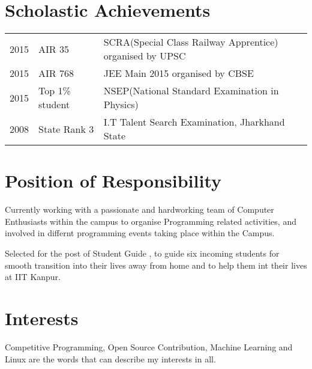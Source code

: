 \documentclass{deedy-resume-openfont}
\begin{document}
\begin{minipage}[t]{0.66\textwidth}
\section{Scholastic Achievements} 
\begin{tabular}{rll}
2015	     & AIR 35  & SCRA(Special Class Railway Apprentice) organised by UPSC\\
2015	     & AIR 768  & JEE Main 2015 organised by CBSE \\
2015	     & Top 1\% student  & NSEP(National Standard Examination in Physics)\\
2008	     & State Rank 3 & I.T Talent Search Examination, Jharkhand State\\
\end{tabular}
\sectionsep




\section{Position of Responsibility}
Currently working with a passionate and hardworking team of Computer Enthusiasts within the campus to organise Programming related activities, and involved in differnt programming events taking place within the Campus.
\sectionsep

Selected for the post of Student Guide , to guide six incoming students for smooth transition into their lives away from home and to help them int their lives at IIT Kanpur.
\sectionsep




\section{Interests} 
Competitive Programming, Open Source Contribution, Machine Learning and Linux are the words that can describe my interests in all.



\sectionsep

\end{minipage} 
\end{document}
